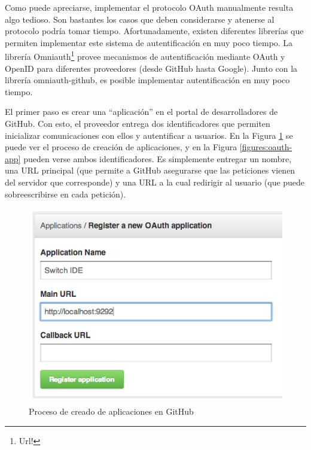 \documentclass[12pt,titlepage,]{article}
\makeatletter
\def\maxwidth{\ifdim\Gin@nat@width>\linewidth\linewidth
\else\Gin@nat@width\fi}
\let\Oldincludegraphics\includegraphics
\renewcommand{\includegraphics}[1]{\Oldincludegraphics[width=\maxwidth]{#1}}
\makeatother
\begin{document}
Como puede apreciarse, implementar el protocolo OAuth manualmente
resulta algo tedioso. Son bastantes los casos que deben considerarse y
atenerse al protocolo podría tomar tiempo. Afortunadamente, existen
diferentes librerías que permiten implementar este sistema de
autentificación en muy poco tiempo. La librería Omniauth\footnote{Url!}
provee mecanismos de autentificación mediante OAuth y OpenID para
diferentes proveedores (desde GitHub hasta Google). Junto con la
librería omniauth-github, es posible implementar autentificación en muy
poco tiempo.

El primer paso es crear una ``aplicación'' en el portal de
desarrolladores de GitHub. Con esto, el proveedor entrega dos
identificadores que permiten inicializar comunicaciones con ellos y
autentificar a usuarios. En la Figura \ref{figures:oauth-create} se
puede ver el proceso de creación de aplicaciones, y en la Figura
\ref{figures:oauth-app} pueden verse ambos identificadores. Es
simplemente entregar un nombre, una URL principal (que permite a GitHub
asegurarse que las peticiones vienen del servidor que corresponde) y una
URL a la cual redirigir al usuario (que puede sobreescribirse en cada
petición).

\begin{figure}[htbp]
\centering
\includegraphics{figures/oauth-create.png}
\caption{Proceso de creado de aplicaciones en GitHub
\label{figures:oauth-create}}
\end{figure}
\end{document}
